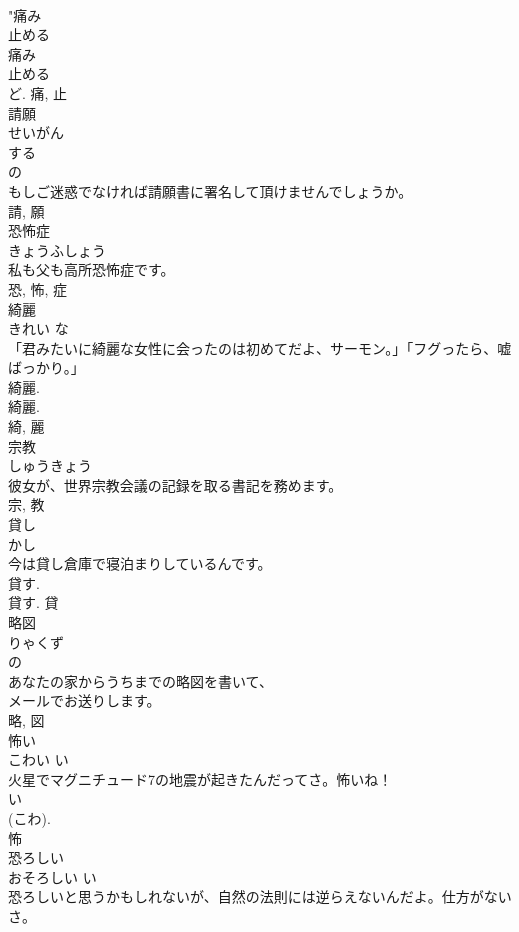 \documentclass[8pt]{extreport}
\begin{document}
\begin{CJK}{UTF8}{min}
\\	"痛み 
\\	止める 
\\	痛み 
\\	止める 
\\	ど.	痛, 止	
\\	請願	
\\	せいがん	
\\	する 
\\	の 
\\	もしご迷惑でなければ請願書に署名して頂けませんでしょうか。	
\\	請, 願	
\\	恐怖症	
\\	きょうふしょう	
\\	私も父も高所恐怖症です。	
\\	恐, 怖, 症	
\\	綺麗	
\\	きれい	な 
\\	「君みたいに綺麗な女性に会ったのは初めてだよ、サーモン。」「フグったら、嘘ばっかり。」	
\\	綺麗. 
\\	綺麗. 
\\	綺, 麗	
\\	宗教	
\\	しゅうきょう	
\\	彼女が、世界宗教会議の記録を取る書記を務めます。	
\\	宗, 教	
\\	貸し	
\\	かし	
\\	今は貸し倉庫で寝泊まりしているんです。	
\\	貸す. 
\\	貸す.	貸	
\\	略図	
\\	りゃくず	
\\	の 
\\	あなたの家からうちまでの略図を書いて、
\\	メールでお送りします。	
\\	略, 図	
\\	怖い	
\\	こわい	い 
\\	火星でマグニチュード7の地震が起きたんだってさ。怖いね！	
\\	い 
\\	(こわ). 
\\	怖	
\\	恐ろしい	
\\	おそろしい	い 
\\	恐ろしいと思うかもしれないが、自然の法則には逆らえないんだよ。仕方がないさ。	

\end{CJK}
\end{document}
